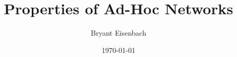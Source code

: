 \def\uni{bje2113}
\def\class{ELEN E6950}
\def\professor{Predrag Jelenkovic}

\author{Bryant Eisenbach}
\title{Properties of Ad-Hoc Networks}
\date{\today}
